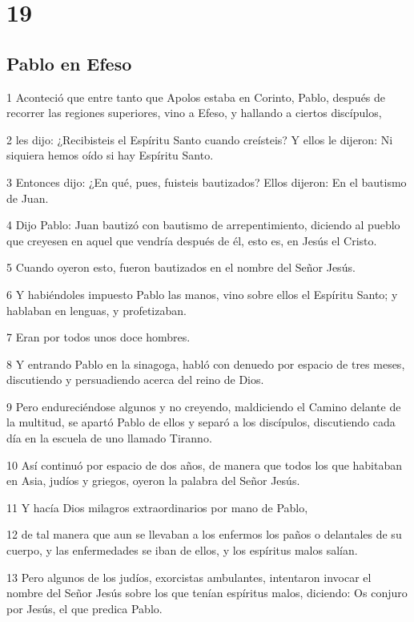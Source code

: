 \chapter{19}

\section*{Pablo en Efeso}

\par 1 Aconteció que entre tanto que Apolos estaba en Corinto, Pablo, después de recorrer las regiones superiores, vino a Efeso, y hallando a ciertos discípulos,
\par 2 les dijo: ¿Recibisteis el Espíritu Santo cuando creísteis? Y ellos le dijeron: Ni siquiera hemos oído si hay Espíritu Santo.
\par 3 Entonces dijo: ¿En qué, pues, fuisteis bautizados? Ellos dijeron: En el bautismo de Juan.
\par 4 Dijo Pablo: Juan bautizó con bautismo de arrepentimiento, diciendo al pueblo que creyesen en aquel que vendría después de él, esto es, en Jesús el Cristo.
\par 5 Cuando oyeron esto, fueron bautizados en el nombre del Señor Jesús.
\par 6 Y habiéndoles impuesto Pablo las manos, vino sobre ellos el Espíritu Santo; y hablaban en lenguas, y profetizaban.
\par 7 Eran por todos unos doce hombres.
\par 8 Y entrando Pablo en la sinagoga, habló con denuedo por espacio de tres meses, discutiendo y persuadiendo acerca del reino de Dios.
\par 9 Pero endureciéndose algunos y no creyendo, maldiciendo el Camino delante de la multitud, se apartó Pablo de ellos y separó a los discípulos, discutiendo cada día en la escuela de uno llamado Tiranno.
\par 10 Así continuó por espacio de dos años, de manera que todos los que habitaban en Asia, judíos y griegos, oyeron la palabra del Señor Jesús.
\par 11 Y hacía Dios milagros extraordinarios por mano de Pablo,
\par 12 de tal manera que aun se llevaban a los enfermos los paños o delantales de su cuerpo, y las enfermedades se iban de ellos, y los espíritus malos salían.
\par 13 Pero algunos de los judíos, exorcistas ambulantes, intentaron invocar el nombre del Señor Jesús sobre los que tenían espíritus malos, diciendo: Os conjuro por Jesús, el que predica Pablo.
